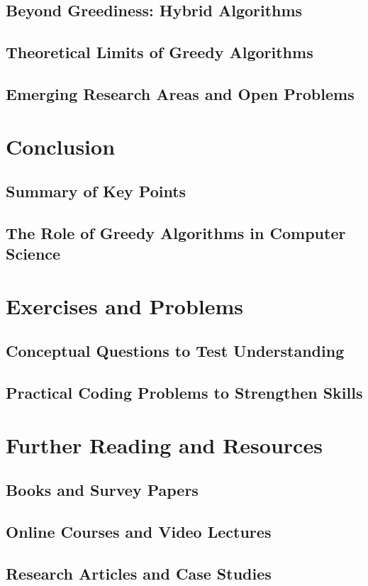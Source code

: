 \documentclass[12pt]{book} %
\begin{document}
\subsection{Beyond Greediness: Hybrid Algorithms}
\subsection{Theoretical Limits of Greedy Algorithms}
\subsection{Emerging Research Areas and Open Problems}

\section{Conclusion}
\subsection{Summary of Key Points}
\subsection{The Role of Greedy Algorithms in Computer Science}

\section{Exercises and Problems}
\subsection{Conceptual Questions to Test Understanding}
\subsection{Practical Coding Problems to Strengthen Skills}

\section{Further Reading and Resources}
\subsection{Books and Survey Papers}
\subsection{Online Courses and Video Lectures}
\subsection{Research Articles and Case Studies}
\end{document}
